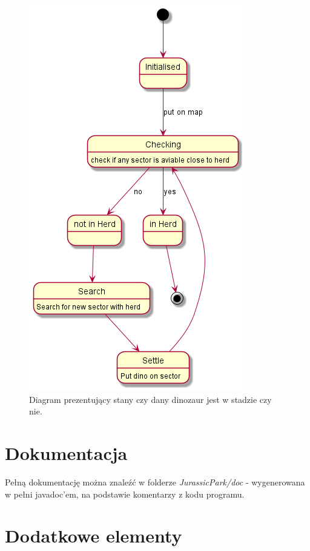 \begin{figure}[h!]
    \centering
    \includegraphics[scale=0.65]{images/state/state_herds.png}
    \caption{Diagram prezentujący stany czy dany dinozaur jest w stadzie czy nie.}
    \label{fig:stherds}
\end{figure}
\newpage

\section{Dokumentacja}

Pełną dokumentację można znaleźć w folderze \textit{JurassicPark/doc} - wygenerowana w pełni javadoc'em, na podstawie komentarzy z kodu programu.

\section{Dodatkowe elementy}

